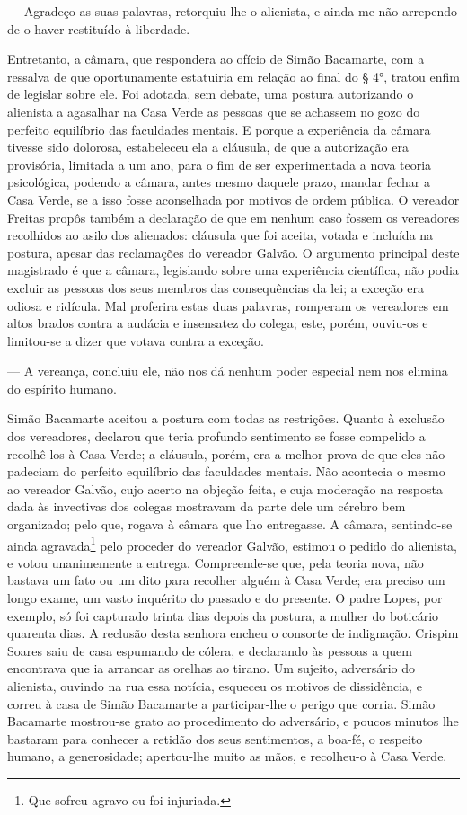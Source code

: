 --- Agradeço as suas palavras, retorquiu-lhe o alienista, e ainda me não
arrependo de o haver restituído à liberdade.

Entretanto, a câmara, que respondera ao ofício de Simão Bacamarte, com a
ressalva de que oportunamente estatuiria em relação ao final do § 4°,
tratou enfim de legislar sobre ele. Foi adotada, sem debate, uma postura
autorizando o alienista a agasalhar na Casa Verde as pessoas que se
achassem no gozo do perfeito equilíbrio das faculdades mentais. E porque
a experiência da câmara tivesse sido dolorosa, estabeleceu ela a
cláusula, de que a autorização era provisória, limitada a um ano, para o
fim de ser experimentada a nova teoria psicológica, podendo a câmara,
antes mesmo daquele prazo, mandar fechar a Casa Verde, se a isso fosse
aconselhada por motivos de ordem pública. O vereador Freitas propôs
também a declaração de que em nenhum caso fossem os vereadores
recolhidos ao asilo dos alienados: cláusula que foi aceita, votada e
incluída na postura, apesar das reclamações do vereador Galvão. O
argumento principal deste magistrado é que a câmara, legislando sobre
uma experiência científica, não podia excluir as pessoas dos seus
membros das consequências da lei; a exceção era odiosa e ridícula. Mal
proferira estas duas palavras, romperam os vereadores em altos brados
contra a audácia e insensatez do colega; este, porém, ouviu-os e
limitou-se a dizer que votava contra a exceção.

--- A vereança, concluiu ele, não nos dá nenhum poder especial nem nos
elimina do espírito humano.

Simão Bacamarte aceitou a postura com todas as restrições. Quanto à
exclusão dos vereadores, declarou que teria profundo sentimento se fosse
compelido a recolhê-los à Casa Verde; a cláusula, porém, era a melhor
prova de que eles não padeciam do perfeito equilíbrio das faculdades
mentais. Não acontecia o mesmo ao vereador Galvão, cujo acerto na
objeção feita, e cuja moderação na resposta dada às invectivas dos
colegas mostravam da parte dele um cérebro bem organizado; pelo que,
rogava à câmara que lho entregasse. A câmara, sentindo-se ainda
agravada\footnote{Que sofreu agravo ou foi injuriada.} pelo proceder do
vereador Galvão, estimou o pedido do alienista, e votou unanimemente a
entrega. Compreende-se que, pela teoria nova, não bastava um fato ou um
dito para recolher alguém à Casa Verde; era preciso um longo exame, um
vasto inquérito do passado e do presente. O padre Lopes, por exemplo, só
foi capturado trinta dias depois da postura, a mulher do boticário
quarenta dias. A reclusão desta senhora encheu o consorte de indignação.
Crispim Soares saiu de casa espumando de cólera, e declarando às pessoas
a quem encontrava que ia arrancar as orelhas ao tirano. Um sujeito,
adversário do alienista, ouvindo na rua essa notícia, esqueceu os
motivos de dissidência, e correu à casa de Simão Bacamarte a
participar-lhe o perigo que corria. Simão Bacamarte mostrou-se grato ao
procedimento do adversário, e poucos minutos lhe bastaram para conhecer
a retidão dos seus sentimentos, a boa-fé, o respeito humano, a
generosidade; apertou-lhe muito as mãos, e recolheu-o à Casa Verde.

